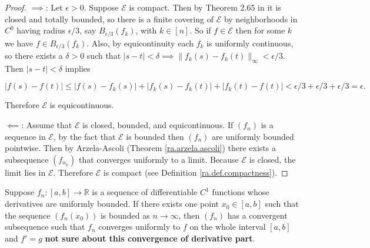 \begin{proof}

\(\implies\): Let \(\epsilon > 0\). Suppose \(\mathcal{E}\) is compact. Then by Theorem 2.65 in \citet{pugh2015real} it is closed and totally bounded, so there is a finite covering of \(\mathcal{E}\) by neighborhoods in \(C^0\) having radius \(\epsilon/3\), say \(B_{\epsilon/3}(f_k)\), with \(k \in [n]\). So if \(f \in \mathcal{E}\) then for some \(k\) we have \(f \in B_{\epsilon/3}(f_k)\). Also, by equicontinuity each \(f_k\) is uniformly continuous, so there exists a \(\delta > 0\) such that \(|s-t| < \delta \implies \lVert f_k(s) - f_k(t) \rVert_\infty < \epsilon/3\). Then \(|s-t | < \delta\) implies

\[
|f(s) - f(t)| \leq | f(s) - f_k(s)| + |f_k(s) - f_k(t) | + |f_k(t) - f(t)| < \epsilon/3 + \epsilon/3 + \epsilon/3 = \epsilon.
\]

Therefore \(\mathcal{E}\) is equicontinuous.

\(\impliedby\): Assume that \(\mathcal{E}\) is closed, bounded, and equicontinuous. If \((f_n)\) is a sequence in \(\mathcal{E}\), by the fact that \(\mathcal{E}\) is bounded then \((f_n)\) are uniformly bounded pointwise. Then by Arzela-Ascoli (Theorem \ref{ra.arzela.ascoli}) there exists a subsequence \((f_{n_k})\) that converges uniformly to a limit. Because \(\mathcal{E}\) is closed, the limit lies in \(\mathcal{E}\). Therefore \(\mathcal{E}\) is compact (see Definition \ref{ra.def.compactness}).


\end{proof}


\begin{proposition}\label{ra.pugh.cor.4.17}

Suppose \(f_n: [a,b] \to \mathbb{R}\) is a sequence of differentiable \(C^1\) functions whose derivatives are uniformly bounded. If there exists one point \(x_0 \in [a,b]\) such that the sequence \((f_n(x_0))\) is bounded as \(n \to \infty\), then \((f_n)\) has a convergent subsequence such that \(f_n\) converges uniformly to \(f\) on the whole interval \([a,b]\) and \(f' = g\)  \textbf{not sure about this convergence of derivative part}. 


\end{proposition}

